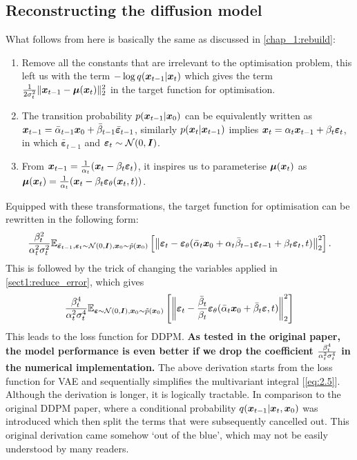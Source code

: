 \subsection{Reconstructing the diffusion model}
What follows from here is basically the same as discussed in \cref{chap_1:rebuild}:
\begin{myquote}
\begin{enumerate}
\item Remove all the constants that are irrelevant to the optimisation problem, this left us with the term $-\log q(\bm{x}_{t-1}|\bm{x}_{t})$ which gives the term $\frac{1}{2\sigma_t^2}\|\bm{x}_{t-1}-\bm{\mu}(\bm{x}_{t})\|_2^2$ in the target function for optimisation.
\item The transition probability $p(\bm{x}_{t-1}|\bm{x}_0)$ can be equivalently written as $\bm{x}_{t-1}=\bar{\alpha}_{t-1}\bm{x}_0+\bar{\beta}_{t-1}\bar{\bm{\varepsilon}}_{t-1}$, similarly $p(\bm{x}_{t}|\bm{x}_{t-1})$ implies $\bm{x}_{t}=\alpha_t\bm{x}_{t-1}+\beta_t\bm{\varepsilon}_t$, in which $\bar{\bm{\varepsilon}}_{t-1}$ and $\bm{\varepsilon}_t\sim\mathcal{N}(0,\bm{I})$.
\item From $\bm{x}_{t-1}=\frac{1}{\alpha_t}(\bm{x}_{t}-\beta_t\bm{\varepsilon}_t)$, it inspires us to parameterise $\bm{\mu}(\bm{x}_{t})$ as $\bm{\mu}(\bm{x}_{t})=\frac{1}{\alpha_t}(\bm{x}_{t}-\beta_t\bm{\varepsilon}_\theta(\bm{x}_{t},t))$.
\end{enumerate}
\end{myquote}
Equipped with these transformations, the target function for optimisation can be rewritten in the following form:
\begin{equation}
    \label{eq:2.7}
    \frac{\beta_t^2}{\alpha_t^2\sigma_t^2}\mathbb{E}_{\bar{\bm{\varepsilon}}_{t-1},\bm{\varepsilon}_t\sim\mathcal{N}(0,\bm{I}),\bm{x}_{0}\sim\tilde{p}(\bm{x}_{0})}\left[\left\| \bm{\varepsilon}_t-\bm{\varepsilon}_\theta (\bar{\alpha}_t \bm{x}_0+\alpha_t\bar{\beta}_{t-1}\bm{\varepsilon}_{t-1} +\beta_t\bm{\varepsilon}_t,t)  \right\|_2^2\right].
\end{equation}
This is followed by the trick of changing the variables applied in \cref{sect1:reduce_error}, which gives
\begin{equation}
    \label{eq:2.8}
    \frac{\beta_t^4}{\alpha_t^2\sigma_t^4}\mathbb{E}_{\bm{\varepsilon}\sim\mathcal{N}(0,\bm{I}),\bm{x}_{0}\sim\tilde{p}(\bm{x}_{0})}\left[\left\| \bm{\varepsilon}_t-\frac{\bar{\beta}_t}{\beta_t}\bm{\varepsilon}_\theta(\bar{\alpha}_t\bm{x}_0 +\bar{\beta}_t\bm{\varepsilon},t)  \right\|_2^2\right]
\end{equation}
This leads to the loss function for DDPM. \textbf{As tested in the original paper, the model performance is even better if we drop the coefficient $\frac{\beta_t^4}{\alpha_t^2\sigma_t^4}$ in the numerical implementation. } The above derivation starts from the loss function for VAE and sequentially simplifies the multivariant integral [\cref{eq:2.5}]. Although the derivation is longer, it is logically tractable. In comparison to the original DDPM paper\cite{ho2020denoising}, where a conditional probability $q(\bm{x}_{t-1}|\bm{x}_{t},\bm{x}_0)$ was introduced which then split the terms that were subsequently cancelled out. This original derivation came somehow `out of the blue', which may not be easily understood by many readers.

